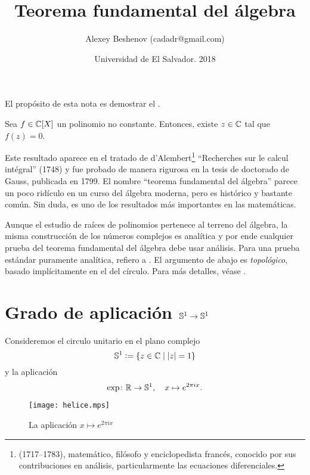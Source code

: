 \documentclass{article}
\author{Alexey Beshenov (cadadr@gmail.com)}
\title{Teorema fundamental del álgebra}
\date{Universidad de El Salvador. 2018}
\numberwithin{equation}{section}
\begin{document}
{\normalfont\sffamily\bfseries \maketitle}

El propósito de esta nota es demostrar el
.

\begin{teorema}
  Sea $f \in \mathbb{C} [X]$ un polinomio no constante. Entonces, existe $z \in \mathbb{C}$
  tal que ${f (z) = 0}$.
\end{teorema}

Este resultado aparece en el tratado de d'Alembert\footnote{ (1717--1783), matemático, filósofo y enciclopedista
  francés, conocido por sus contribuciones en análisis, particularmente las
  ecuaciones diferenciales.} ``Recherches sur le calcul intégral'' (1748) y fue
probado de manera rigurosa en la tesis de doctorado de Gauss, publicada en
1799. El nombre ``teorema fundamental del álgebra'' parece un poco ridículo en
un curso del álgebra moderna, pero es histórico y bastante común. Sin duda,
es uno de los resultados más importantes en las matemáticas.

Aunque el estudio de raíces de polinomios pertenece al terreno del álgebra,
la misma construcción de los números complejos es analítica y por ende cualquier
prueba del teorema fundamental del álgebra debe usar análisis. Para una prueba
estándar puramente analítica, refiero a \cite[\S 3.3]{Vinberg-2003}.
El argumento de abajo es \emph{topológico}, basado implícitamente en
el  del círculo. Para más detalles, véase
\cite[Chapter~1]{May-1999-Concise}.


\section{Grado de aplicación $\mathbb{S}^1 \to \mathbb{S}^1$}

Consideremos el circulo unitario en el plano complejo
$$\mathbb{S}^1 \mathrel{\mathop:}= \{ z\in \mathbb{C} \mid |z| = 1 \}$$
y la aplicación
$$\exp\colon \mathbb{R} \to \mathbb{S}^1, \quad x \mapsto e^{2\pi i x}.$$

\begin{figure}[h]
  \begin{center}
    \texttt{[image: helice.mps]}
  \end{center}

  \caption{La aplicación $x \mapsto e^{2\pi i x}$}
\end{figure}
\end{document}
